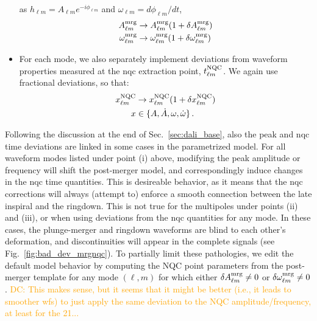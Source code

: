 \documentclass[prd,amssymb,amsmath,amsfonts,nofootinbib,reprint,showpacs,longbibliography]{revtex4-1}
\newcommand{\DC}[1]{{\textcolor{orange}{{DC: #1}} }}
\newcommand{\amrg}[1]{{A_{#1}^{\rm mrg}}}
\newcommand{\omgmrg}[1]{{\omega_{#1}^{\rm mrg}}}
\begin{document}
\begin{itemize}
    as $h_{\ell m} = A_{\ell m} e^{-i \phi_{\ell m}}$ and $\omega_{\ell m} = d\phi_{\ell m}/dt$,
    \begin{subequations}
    \begin{align}
    A_{\ell m}^{\rm mrg} &\rightarrow A_{\ell m}^{\rm mrg} (1 + \delta A_{\ell m}^{\rm mrg}) \\
    \omega_{\ell m}^{\rm mrg} &\rightarrow \omega_{\ell m}^{\rm mrg} (1 + \delta \omega_{\ell m}^{\rm mrg})
    \end{align}
    \end{subequations}
    \item For each mode, we also separately implement deviations from waveform properties measured at the \ac{nqc}
    extraction point, $t_{\ell m}^{\rm NQC}$. We again use fractional deviations, so that:
    \begin{subequations}
    \begin{align}
    x_{\ell m}^{\rm NQC} &\rightarrow x_{\ell m}^{\rm NQC} (1 + \delta x_{\ell m}^{\rm NQC}) \\
    x &\in \{A, \dot{A}, \omega, \dot{\omega}\} \, .
    \end{align}
    \end{subequations}
\end{itemize}

Following the discussion at the end of Sec.~\ref{sec:dali_base}, also the peak and \ac{nqc} time deviations
are linked in some cases in the parametrized model. For all waveform modes listed under point (i) above,
modifying the peak amplitude or frequency will shift the post-merger model, and correspondingly induce
changes in the \ac{nqc} time quantities. This is desireable behavior, as it means that the \ac{nqc}
corrections will always (attempt to) enforce a smooth connection between the late inspiral and the ringdown.
This is not true for the multipoles under points (ii) and (iii), or when using deviations from the
\ac{nqc} quantities for any mode. In these cases, the plunge-merger and ringdown waveforms are blind to each
other's deformation, and discontinuities will appear in the complete signals (see Fig.~\ref{fig:bad_dev_mrgnqc}).
\color{blue}To partially limit these pathologies, we edit the default model behavior by computing the NQC point
parameters from the post-merger template for any mode $(\ell, m)$ for which either
$\delta \amrg{\ell m} \neq 0$ or $\delta \omgmrg{\ell m} \neq 0$.\color{black}
\DC{This makes sense, but it seems that it might be better (i.e., it leads to smoother wfs) to just
apply the same deviation to the NQC amplitude/frequency, at least for the 21...}
\end{document}
